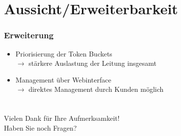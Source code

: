 \documentclass[14pt]{beamer}
\begin{document}
\section{Aussicht/Erweiterbarkeit}
\begin{frame}
\frametitle{Erweiterung}
\begin{itemize}
  \item Priorisierung der Token Buckets \\$\rightarrow$ stärkere Auslastung der Leitung insgesamt
  \item Management über Webinterface \\$\rightarrow$ direktes Management durch Kunden möglich
\end{itemize}
\end{frame}

\section[]{}


\section[]{}
\begin{frame}
\begin{center}
\Large Vielen Dank für Ihre Aufmerksamkeit!\\Haben Sie noch Fragen?\end{center}
\end{frame}




\end{document}

